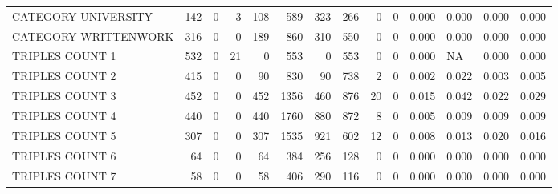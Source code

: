 \begin{tabular}{lrrrrrrrrrllll}
 CATEGORY UNIVERSITY      &             142 &             0 &               3 &             108 &             589 &  323 &  266 &    0 &    0 & 0.000 & 0.000 & 0.000 & 0.000 \\
 CATEGORY WRITTENWORK     &             316 &             0 &               0 &             189 &             860 &  310 &  550 &    0 &    0 & 0.000 & 0.000 & 0.000 & 0.000 \\
 TRIPLES COUNT 1          &             532 &             0 &              21 &               0 &             553 &    0 &  553 &    0 &    0 & 0.000 & NA    & 0.000 & 0.000 \\
 TRIPLES COUNT 2          &             415 &             0 &               0 &              90 &             830 &   90 &  738 &    2 &    0 & 0.002 & 0.022 & 0.003 & 0.005 \\
 TRIPLES COUNT 3          &             452 &             0 &               0 &             452 &            1356 &  460 &  876 &   20 &    0 & 0.015 & 0.042 & 0.022 & 0.029 \\
 TRIPLES COUNT 4          &             440 &             0 &               0 &             440 &            1760 &  880 &  872 &    8 &    0 & 0.005 & 0.009 & 0.009 & 0.009 \\
 TRIPLES COUNT 5          &             307 &             0 &               0 &             307 &            1535 &  921 &  602 &   12 &    0 & 0.008 & 0.013 & 0.020 & 0.016 \\
 TRIPLES COUNT 6          &              64 &             0 &               0 &              64 &             384 &  256 &  128 &    0 &    0 & 0.000 & 0.000 & 0.000 & 0.000 \\
 TRIPLES COUNT 7          &              58 &             0 &               0 &              58 &             406 &  290 &  116 &    0 &    0 & 0.000 & 0.000 & 0.000 & 0.000 \\
\hline
\end{tabular}